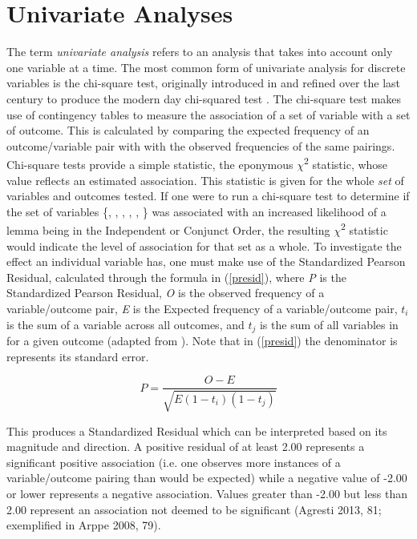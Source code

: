 \section{Univariate Analyses}
The term \textit{univariate analysis} refers to an analysis that takes into account only one variable at a time.  The most common form of univariate analysis for discrete variables is the chi-square test, originally introduced in \citet{pearson1900x} and refined over the last century to produce the modern day chi-squared test \citep{agresti2013categorical}. The chi-square test makes use of contingency tables to measure the association of a set of variable with a set of outcome. This is calculated by comparing the expected frequency of an outcome/variable pair with with the observed frequencies of the same pairings. Chi-square tests provide a simple statistic, the eponymous $\chi$\textsuperscript{2} statistic, whose value reflects an estimated association. This statistic is given for the whole \textit{set} of variables and outcomes tested. If one were to run a chi-square test to determine if the set of variables \{, , , , , \} was associated with an increased likelihood of a lemma being in the Independent or Conjunct Order, the resulting $\chi$\textsuperscript{2} statistic would indicate the level of association for that set as a whole. To investigate the effect an individual variable has, one must make use of the Standardized Pearson Residual, calculated through the formula in (\ref{presid}), where \textit{P} is the Standardized Pearson Residual, \textit{O} is the observed frequency of a variable/outcome pair, \textit{E} is the Expected frequency of a variable/outcome pair, $t_{i}$ is the sum of a variable across all outcomes, and $t_{j}$ is the sum of all variables in for a given outcome  (adapted from \citep[81]{agresti2013categorical}). Note that in (\ref{presid}) the denominator is represents its standard error.

\begin{equation}
P = \frac{O - E}{\sqrt{E(1-t_{i})(1-t_{j})}}
\label{presid}
\end{equation}

This produces a Standardized Residual which can be interpreted based on its magnitude and direction. A positive residual of at least 2.00 represents a significant positive association (i.e. one observes more instances of a variable/outcome pairing than would be expected) while a negative value of -2.00 or lower represents a negative association. Values greater than -2.00 but less than 2.00 represent an association not deemed to be significant (Agresti 2013, 81; exemplified in Arppe 2008, 79). 

